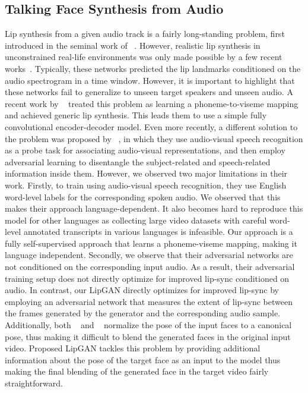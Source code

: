 \documentclass[sigconf]{acmart}
\begin{document}
\subsection{Talking Face Synthesis from Audio}
Lip synthesis from a given audio track is a fairly long-standing problem, first introduced in the seminal work of ~\citet{bregler1997video}. However, realistic lip synthesis in unconstrained real-life environments was only made possible by a few recent works~\cite{suwajanakorn2017synthesizing,kumar2017obamanet}. Typically, these networks predicted the lip landmarks conditioned on the audio spectrogram in a time window. However, it is important to highlight that these networks fail to generalize to unseen target speakers and unseen audio. A recent work by ~\citet{chung2017you} treated this problem as learning a phoneme-to-viseme mapping and achieved generic lip synthesis. This leads them to use a simple fully convolutional encoder-decoder model. Even more recently, a different solution to the problem was proposed by ~\citet{zhou2018talking}, in which they use audio-visual speech recognition as a probe task for associating audio-visual representations, and then employ adversarial learning to disentangle the subject-related and speech-related information inside them. However, we observed two major limitations in their work. Firstly, to train using audio-visual speech recognition, they use  English word-level labels for the corresponding spoken audio. We observed that this makes their approach language-dependent. It also becomes hard to reproduce this model for other languages as collecting large video datasets with careful word-level annotated transcripts in various languages is infeasible. Our approach is a fully self-supervised approach that learns a phoneme-viseme mapping, making it language independent. Secondly, we observe that their adversarial networks are not conditioned on the corresponding input audio. As a result, their adversarial training setup does not directly optimize for improved lip-sync conditioned on audio. In contrast, our LipGAN directly optimizes for improved lip-sync by employing an adversarial network that measures the extent of lip-sync between the frames generated by the generator and the corresponding audio sample. Additionally, both ~\citet{zhou2018talking} and ~\citet{chung2017you} normalize the pose of the input faces to a canonical pose, thus making it difficult to blend the generated faces in the original input video. Proposed LipGAN tackles this problem by providing additional information about the pose of the target face as an input to the model thus making the final blending of the generated face in the target video fairly straightforward.
\end{document}
